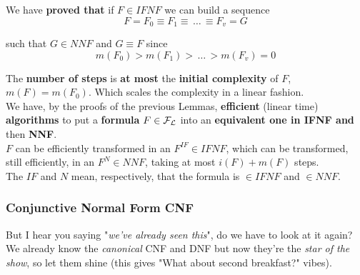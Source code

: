 \documentclass[11pt]{article}
\begin{document}
	\newpage
	
	We have \textbf{proved that} if $F \in IFNF$ we can build a sequence 
	$$ F = F_0 \equiv F_1 \equiv \, \dots \, \equiv F_v = G$$
	
	such that $G \in NNF$ and $G \equiv F$ since 
	$$ m(F_0) > m(F_1) > \, \dots \, > m(F_v) = 0 $$
	
	The \textbf{number of steps} is \textbf{at most} the \textbf{initial complexity} of $F$, $m(F) = m(F_0)$. Which scales the complexity in a linear fashion.\\
	
	We have, by the proofs of the previous Lemmas, \textbf{efficient} (linear time) \textbf{algorithms} to put a \textbf{formula} $F \in \mathcal{F}_\mathcal{L}$ into an \textbf{equivalent one in IFNF and} then \textbf{NNF}. \\
	
	$F$ can be efficiently transformed in an $F^{IF} \in IFNF$, which can be transformed, still efficiently, in an $F^{N} \in NNF$, taking at most $i(F) + m(F)$ steps.\\
	
	The $IF$ and $N$ mean, respectively, that the formula is $\in IFNF$ and $\in NNF$.\\
	
%	
	
	\newpage
	
	\subsubsection{Conjunctive Normal Form CNF}
	
	But I hear you saying "\textit{we've already seen this}", do we have to look at it again? We already know the \textit{canonical} CNF and DNF but now they're the \textit{star of the show}, so let them shine (this gives "What about second breakfast?" vibes).\\
	
\end{document}
